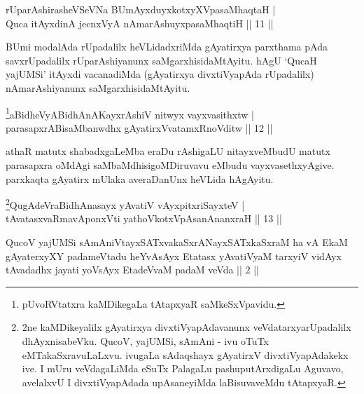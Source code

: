 
\begin{shl}
rUparAshirasheVSeVNa BUmAyxduyxkotxyXVpasaMhaqtaH | \\
Quca itAyxdinA jecnxVyA nAmarAshuyxpasaMhaqtiH \hfill ||  11 || 
\end{shl}

\begin{artha} 
BUmi modalAda rUpadalilx heVLidadxriMda gAyatirxya parxthama pAda 
savxrUpadalilx rUparAshiyanunx saMgarxhisidaMtAyitu. hAgU `QucaH 
yajUMSi' itAyxdi vacanadiMda (gAyatirxya divxtiVyapAda rUpadalilx) 
nAmarAshiyanunx saMgarxhisidaMtAyitu.
\end{artha}



\begin{shl}
\footnote{pUvoRVtatxra kaMDikegaLa tAtapxyaR saMkeSxVpavidu.}aBidheVyABidhAnAKayxrAshiV nitwyx vayxvasithxtw | \\
parasapxrABisaMbanwdhx gAyatirxVvatamxRnoVditw \hfill ||  12 ||
\end{shl}

\begin{artha} 
athaR matutx shabadxgaLeMba eraDu rAshigaLU nitayxveMbudU matutx 
parasapxra oMdAgi saMbaMdhisigoMDiruvavu eMbudu vayxvasethxyAgive. 
parxkaqta gAyatirx mUlaka averaDanUnx heVLida hAgAyitu.
\end{artha}



\begin{shl}
\footnote{2ne kaMDikeyalilx gAyatirxya divxtiVyapAdavanunx 
veVdatarxyarUpadalilx dhAyxnisabeVku. QucoV, yajUMSi, sAmAni - ivu 
oTuTx eMTakaSxravuLaLxvu. ivugaLa sAdaqshayx gAyatirxV 
divxtiVyapAdakekx ive. I mUru veVdagaLiMda eSuTx PalagaLu 
pashuputArxdigaLu Aguvavo, avelalxvU I divxtiVyapAdada upAsaneyiMda 
laBisuvaveMdu tAtapxyaR.}QugAdeVraBidhAnasayx yAvatiV vAyxpitxriSayxteV | \\
tAvatasxvaRmavAponxVti yathoVkotxVpAsanAnanxraH \hfill ||  13 || 
\end{shl}

\begin{kandikeshl}
QucoV yajUMSi sAmAniVtayxSATxvakaSxrANayxSATxkaSxraM ha vA EkaM gAyaterxyXY padameVtadu heYvAsAyx Etatasx yAvatiVyaM tarxyiV vidAyx tAvadadhx jayati yoV\s sAyx EtadeVvaM padaM veVda || 2 ||
\end{kandikeshl}

